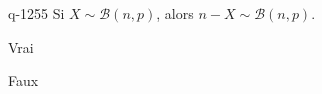 \begin{truefalse}{q-1255}
Si $X\sim \mathcal{B}(n,p)$, alors $n-X\sim \mathcal{B}(n,p)$.
\item Vrai
\item* Faux
\end{truefalse}


